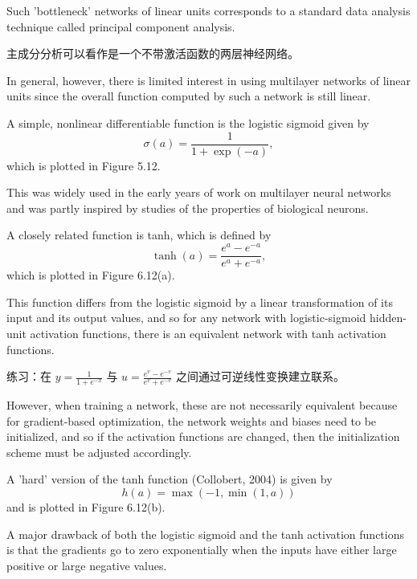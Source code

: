 \documentclass{article}
\begin{document}
Such 'bottleneck' networks of linear units corresponds to a standard data analysis technique called principal component analysis. 

{\color{red}
主成分分析可以看作是一个不带激活函数的两层神经网络。
}

In general, however, there is limited interest in using multilayer networks of linear units since the overall function computed by such a network is still linear.

A simple, nonlinear differentiable function is the logistic sigmoid given by
\begin{equation}
\sigma(a) = \frac{1}{1 + \exp(-a)}, \tag{6.13}
\end{equation}
which is plotted in Figure 5.12. 

This was widely used in the early years of work on multilayer neural networks and was partly inspired by studies of the properties of biological neurons. 

A closely related function is tanh, which is defined by
\begin{equation}
\tanh(a) = \frac{e^a - e^{-a}}{e^a + e^{-a}}, \tag{6.14}
\end{equation}
which is plotted in Figure 6.12(a). 

This function differs from the logistic sigmoid by a linear transformation of its input and its output values, and so for any network with logistic-sigmoid hidden-unit activation functions, there is an equivalent network with tanh activation functions. 

{\color{red}
练习：在 $y=\frac{1}{1+e^{-x}}$ 与 $u=\frac{e^{v}-e^{-v}}{e^{v}+e^{-v}}$ 之间通过可逆线性变换建立联系。
}

However, when training a network, these are not necessarily equivalent because for gradient-based optimization, the network weights and biases need to be initialized, and so if the activation functions are changed, then the initialization scheme must be adjusted accordingly. 

A 'hard' version of the tanh function (Collobert, 2004) is given by
\begin{equation}
h(a) = \max(-1, \min(1, a)) \tag{6.15}
\end{equation}
and is plotted in Figure 6.12(b).

A major drawback of both the logistic sigmoid and the tanh activation functions is that the gradients go to zero exponentially when the inputs have either large positive or large negative values. 
\end{document}
